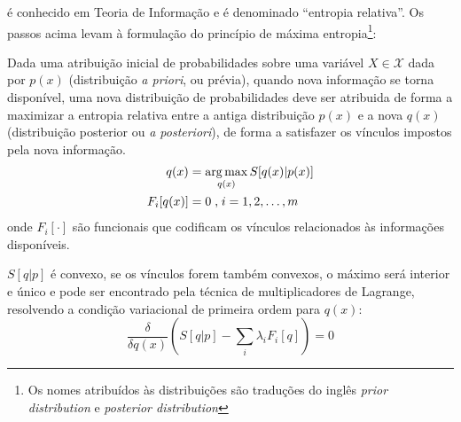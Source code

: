  é conhecido em Teoria de Informação\cite{Cover2006} e é denominado ``entropia relativa''. Os passos acima levam à formulação do princípio de máxima entropia\footnote{Os nomes atribuídos às distribuições são traduções do inglês \textit{prior distribution} e {\it posterior distribution}}:

\begin{Principio}
  Dada uma atribuição inicial de probabilidades sobre uma variável $X \in \mathcal{X}$ dada por $p(x)$ (distribuição \textit{a priori}, ou prévia), quando nova informação se torna disponível, uma nova distribuição de probabilidades deve ser atribuida de forma a maximizar a entropia relativa entre a antiga distribuição $p(x)$  e a nova $q(x)$ (distribuição  posterior ou \textit{a posteriori}), de forma a satisfazer os vínculos impostos pela nova informação.
  \begin{align}
    q(x) &= \operatorname*{arg\,max}_{q(x)} S[q(x)|p(x)] \\
    F_i[q(x)] &= 0 \;\text{,}\;i = 1,2,\ldots,m
  \end{align}
  onde $F_i[\cdot]$ são funcionais que codificam os vínculos relacionados às informações disponíveis.
\end{Principio}

 $S[q | p]$ é convexo, se os vínculos forem também convexos, o máximo será interior e único e pode ser encontrado pela técnica de multiplicadores de Lagrange, resolvendo a condição variacional de primeira ordem para $q(x)$:
\begin{equation}
\label{eq:entropymaximization}
\frac{\delta }{\delta q(x)}\left( S[q|p] - \sum_{i} \lambda_i F_i[q]\right) = 0
\end{equation}

